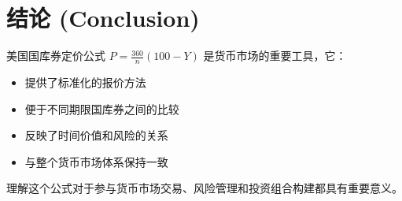 \section{结论 (Conclusion)}

美国国库券定价公式 $P = \frac{360}{n}(100 - Y)$ 是货币市场的重要工具，它：

\begin{itemize}
    \item 提供了标准化的报价方法
    \item 便于不同期限国库券之间的比较
    \item 反映了时间价值和风险的关系
    \item 与整个货币市场体系保持一致
\end{itemize}

理解这个公式对于参与货币市场交易、风险管理和投资组合构建都具有重要意义。
